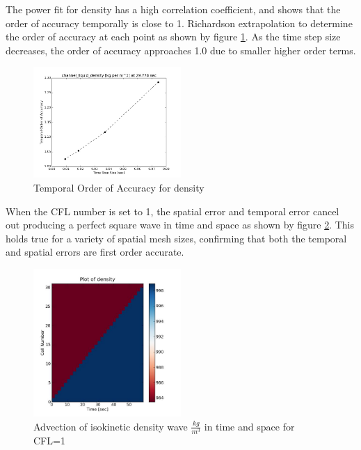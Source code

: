     The power fit for density has a high correlation coefficient, and
    shows that the order of accuracy temporally is close to 1. Richardson
    extrapolation to determine the order of accuracy at each point as shown by 
    figure \ref{fig:Temporal_Order_Of_Accuracy_rho}. As the time step size
    decreases, the order of accuracy approaches 1.0 due to smaller higher order
    terms. 
        
    
    \begin{figure}[!h]
    	\centering
    	\includegraphics[width=0.50\textwidth]{images/Isokinetic_Advection/Temoral_Order_Of_Accuracy_rho}
    	\caption{Temporal Order of Accuracy for density}
    	\label{fig:Temporal_Order_Of_Accuracy_rho}
    \end{figure}
    
    When the CFL number is set to 1, the spatial error and temporal error
    cancel out producing a perfect square wave in time and space as shown by
    figure \ref{fig:density_2D}. This holds true for a variety of spatial
    mesh sizes, confirming that both the temporal and spatial errors are first
    order accurate. 
    
    \begin{figure}[!h]
    	\centering
    	\includegraphics[width=0.50\textwidth]{images/Isokinetic_Advection/density_2D}
    	\caption{Advection of isokinetic density wave $\frac{kg}{m^{3}}$ in time
    	and space for CFL=1}
    	\label{fig:density_2D}
    \end{figure}








